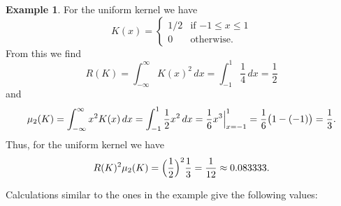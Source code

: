 \documentclass[
  a4paper,
]{article}
\theoremstyle{definition}
\theoremstyle{definition}
\newtheorem{example}{Example}[section]
\theoremstyle{definition}
\theoremstyle{definition}
\theoremstyle{remark}
\begin{document}
\begin{example}
For the uniform kernel we have
\begin{equation*}
  K(x)
  = \begin{cases}
      1/2 & \mbox{if $-1 \leq x \leq 1$} \\
      0 & \mbox{otherwise.}
    \end{cases}
\end{equation*}
From this we find
\begin{equation*}
  R(K)
  = \int_{-\infty}^\infty K(x)^2 \,dx
  = \int_{-1}^1 \frac14 \,dx
  = \frac12
\end{equation*}
and
\begin{equation*}
  \mu_2(K)
  = \int_{-\infty}^\infty x^2 K(x) \,dx
  = \int_{-1}^1 \frac12 x^2 \,dx
  = \frac16 \Bigl. x^3 \Bigr|_{x=-1}^1
  = \frac16 \bigl( 1 - (-1) \bigr)
  = \frac13.
\end{equation*}
Thus, for the uniform kernel we have
\begin{equation*}
  R(K)^2 \mu_2(K)
  = \Bigl( \frac12 \Bigr)^2 \frac13
  = \frac{1}{12}
  \approx 0.083333.
\end{equation*}
\end{example}

Calculations similar to the ones in the example give the following
values:
\end{document}
